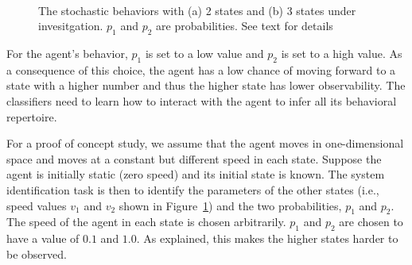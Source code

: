 \begin{figure}[!t]%
	\centering
		\\
		\caption{The stochastic behaviors with (a) 2 states and (b) 3 states under invesitgation. $p_1$ and $p_2$ are probabilities. See text for details\label{fig:stochastic_interaction_case_study}}
\end{figure}

For the agent's behavior, $p_1$ is set to a low value and $p_2$ is set to a high value. As a consequence of this choice, the agent has a low chance of moving forward to a state with a higher number and thus the higher state has lower observability. The classifiers need to learn how to interact with the agent to infer all its behavioral repertoire.

For a proof of concept study, we assume that the agent moves in one-dimensional space and moves at a constant but different speed in each state. Suppose the agent is initially static (zero speed) and its initial state is known. The system identification task is then to identify the parameters of the other states (i.e., speed values $v_1$ and $v_2$ shown in Figure~\ref{fig:stochastic_interaction_case_study}) and the two probabilities, $p_1$ and $p_2$. The speed of the agent in each state is chosen arbitrarily. $p_1$ and $p_2$ are chosen to have a value of $0.1$ and $1.0$. As explained, this makes the higher states harder to be observed.


